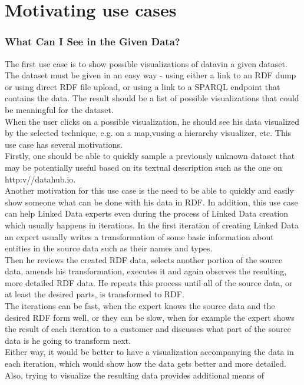 \documentclass[a4paper,12pt,oneside]{report}
\begin{document}
{{{\section{Motivating use cases}
\subsubsection{What Can I See in the Given Data?}
{The first use case is to show possible visualizations of datavin a given dataset. The dataset must be given in an easy way - using either a link to an RDF dump or using direct RDF file upload, or using a link to a SPARQL endpoint that
contains the data. The result should be a list of possible visualizations that could be meaningful for the dataset.\\
 When the user clicks on a possible visualization, he should see his data visualized by the selected technique, e.g. on a map,vusing a hierarchy visualizer, etc. This use case has several motivations.\\
Firstly, one should be able to quickly sample a previously unknown dataset that may be potentially useful based on its textual description such as the one on http:v//datahub.io. \\
 Another motivation for this use case is the need to be able to quickly and easily show someone what can be done with his data in RDF. In addition, this use case can help Linked Data experts even during the process of Linked Data creation which usually happens in iterations. In the first iteration of creating Linked Data an expert usually writes a transformation of some basic information about entities in the source data such as their names and types.\\
Then he reviews the created RDF data, selects another portion of the source data, amends his transformation, executes it and again observes the resulting, more detailed RDF data. He repeats this process until all of the source data, or at least the desired parts, is transformed to RDF.\\
 The iterations can be fast, when the expert knows the source data and the desired RDF form well, or they can be slow, when for example the expert shows the result of each iteration to a customer and discusses what part of the source data is he going to transform
next. \\
Either way, it would be better to have a visualization accompanying the data in each iteration, which would show how the data gets better and more detailed. Also, trying to visualize the resulting data provides additional means of
}}}}
\end{document}
